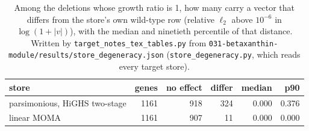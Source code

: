 \begin{table}[H]
  \centering
  \footnotesize
  \caption[Degeneracy of the stores]{Among the deletions whose growth ratio is 1, how many carry a vector that differs from the store's own wild-type row (relative $\ell_2$ above $10^{-6}$ in $\log(1+|v|)$), with the median and ninetieth percentile of that distance. Written by \texttt{target\_notes\_tex\_tables.py} from \texttt{031-betaxanthin-module/results/store\_degeneracy.json} (\texttt{store\_degeneracy.py}, which reads every target store).}
  \label{tab:store-degeneracy}
  \begin{tabular}{@{}lrrrrr@{}}
    \hline
    store & genes & no effect & differ & median & p90 \\
    \hline
    parsimonious, HiGHS two-stage & 1161 & 918 & 324 & 0.000 & 0.376 \\
    linear MOMA & 1161 & 907 & 11 & 0.000 & 0.000 \\
    \hline
  \end{tabular}
\end{table}
